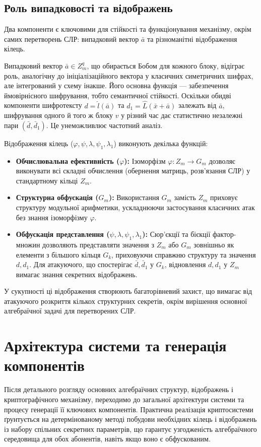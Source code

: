 \subsection{Роль випадковості та відображень}
\label{subsec:randomness_mappings_role}
Два компоненти є ключовими для стійкості та функціонування механізму, окрім самих перетворень СЛР: випадковий вектор $\bar{a}$ та різноманітні відображення кілець.

Випадковий вектор $\bar{a} \in Z_m^q$, що обирається Бобом для кожного блоку, відіграє роль, аналогічну до ініціалізаційного вектора у класичних симетричних шифрах, але інтегрований у схему інакше.
Його основна функція — забезпечення ймовірнісного шифрування, тобто семантичної стійкості.
Оскільки обидві компоненти шифротексту $d = \hat{l}(\bar{a})$ та $d_1 = \hat{L}(\bar{x} + \bar{a})$ залежать від $\bar{a}$, шифрування одного й того ж блоку $v$ у різний час дає статистично незалежні пари $(\bar{d}, \bar{d}_1)$.
Це унеможливлює частотний аналіз.

Відображення кілець ($\varphi, \psi, \lambda, \psi_1, \lambda_1$) виконують декілька функцій:
\begin{itemize}
    \item \textbf{Обчислювальна ефективність ($\varphi$):} Ізоморфізм $\varphi: Z_m \to G_m$ дозволяє виконувати всі складні обчислення (обернення матриць, розв'язання СЛР) у стандартному кільці $Z_m$.
    \item \textbf{Структурна обфускація ($G_m$):} Використання $G_m$ замість $Z_m$ приховує структуру модульної арифметики, ускладнюючи застосування класичних атак без знання ізоморфізму $\varphi$.
    \item \textbf{Обфускація представлення ($\psi, \lambda, \psi_1, \lambda_1$):} Сюр'єкції та бієкції фактор-множин дозволяють представляти значення з $Z_m$ або $G_m$ зовнішньо як елементи з більшого кільця $G_k$, приховуючи справжню структуру та значення $d, d_1$.
    Для атакуючого, що спостерігає $\bar{d}, \bar{d}_1$ у $G_k$, відновлення $d, d_1$ у $Z_m$ вимагає знання секретних відображень.
\end{itemize}
У сукупності ці відображення створюють багаторівневий захист, що вимагає від атакуючого розкриття кількох структурних секретів, окрім вирішення основної алгебраїчної задачі для перетворених СЛР.


\section{Архітектура системи та генерація компонентів}
\label{sec:architecture_generation}
Після детального розгляду основних алгебраїчних структур, відображень і криптографічного механізму, переходимо до загальної архітектури системи та процесу генерації її ключових компонентів.
Практична реалізація криптосистеми ґрунтується на детермінованому методі побудови необхідних кілець і відображень із набору спільних секретних параметрів, що гарантує узгодженість алгебраїчного середовища для обох абонентів, навіть якщо воно є обфускованим.

